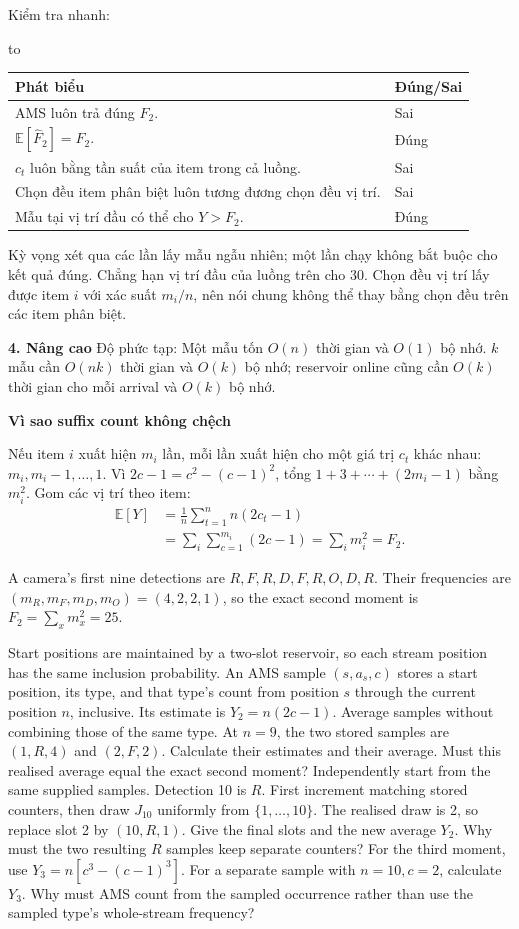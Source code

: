 \documentclass[10pt,a4paper,twocolumn]{article}
\newcommand{\key}[1]{#1:\enspace}
\newcommand{\advancedheading}[1]{%
  \par\addvspace{4pt}\noindent\textbf{#1}\par\nobreak\addvspace{1pt}}
\newenvironment{examtable}[1]{%
  \par\addvspace{2pt}\noindent\hbox to \linewidth\bgroup\hfil
  \setlength{\tabcolsep}{4pt}%
  \renewcommand{\arraystretch}{1.12}\begin{tabular}{#1}%
}{\end{tabular}\hfil\egroup\par\addvspace{2pt}}
\newcommand{\unitheading}[2]{%
  \par\addvspace{1pt}\noindent\textbf{#1. #2}\enspace}
\newcommand{\unitadvanced}{\unitheading{4}{Nâng cao}}
\begin{document}
\key{Kiểm tra nhanh}
\par\nopagebreak
\begin{examtable}{@{}p{.76\linewidth}l@{}}
\toprule
Phát biểu & Đúng/Sai \\
\midrule
AMS luôn trả đúng $F_2$. & Sai \\
$\mathbb E[\widehat F_2]=F_2$. & Đúng \\
$c_t$ luôn bằng tần suất của item trong cả luồng. & Sai \\
Chọn đều item phân biệt luôn tương đương chọn đều vị trí. & Sai \\
Mẫu tại vị trí đầu có thể cho $Y>F_2$. & Đúng \\
\bottomrule
\end{examtable}
Kỳ vọng xét qua các lần lấy mẫu ngẫu nhiên; một lần chạy không bắt buộc cho kết quả đúng. Chẳng hạn vị trí đầu của luồng trên cho 30. Chọn đều vị trí lấy được item $i$ với xác suất $m_i/n$, nên nói chung không thể thay bằng chọn đều trên các item phân biệt.

\unitadvanced
\key{Độ phức tạp} Một mẫu tốn $O(n)$ thời gian và $O(1)$ bộ nhớ. $k$ mẫu cần $O(nk)$ thời gian và $O(k)$ bộ nhớ; reservoir online cũng cần $O(k)$ thời gian cho mỗi arrival và $O(k)$ bộ nhớ.

\advancedheading{Vì sao suffix count không chệch}
Nếu item $i$ xuất hiện $m_i$ lần, mỗi lần xuất hiện cho một giá trị $c_t$ khác nhau: $m_i,m_i-1,\ldots,1$. Vì $2c-1=c^2-(c-1)^2$, tổng $1+3+\cdots+(2m_i-1)$ bằng $m_i^2$. Gom các vị trí theo item:
\begin{align*}
\mathbb E[Y]
  &=\frac1n\sum_{t=1}^n n(2c_t-1)\\
  &=\sum_i\sum_{c=1}^{m_i}(2c-1)
   =\sum_i m_i^2=F_2.
\end{align*}

A camera's first nine detections are $R,F,R,D,F,R,O,D,R$. Their frequencies are $(m_R,m_F,m_D,m_O)=(4,2,2,1)$, so the exact second moment is $F_2=\sum_x m_x^2=25$.

Start positions are maintained by a two-slot reservoir, so each stream position has the same inclusion probability. An AMS sample $(s,a_s,c)$ stores a start position, its type, and that type's count from position $s$ through the current position $n$, inclusive. Its estimate is $Y_2=n(2c-1)$. Average samples without combining those of the same type.
 At $n=9$, the two stored samples are $(1,R,4)$ and $(2,F,2)$. Calculate their estimates and their average. Must this realised average equal the exact second moment?
 Independently start from the same supplied samples. Detection 10 is $R$. First increment matching stored counters, then draw $J_{10}$ uniformly from $\{1,\ldots,10\}$. The realised draw is 2, so replace slot 2 by $(10,R,1)$. Give the final slots and the new average $Y_2$. Why must the two resulting $R$ samples keep separate counters?
 For the third moment, use $Y_3=n[c^3-(c-1)^3]$. For a separate sample with $n=10,c=2$, calculate $Y_3$. Why must AMS count from the sampled occurrence rather than use the sampled type's whole-stream frequency?
\end{document}
